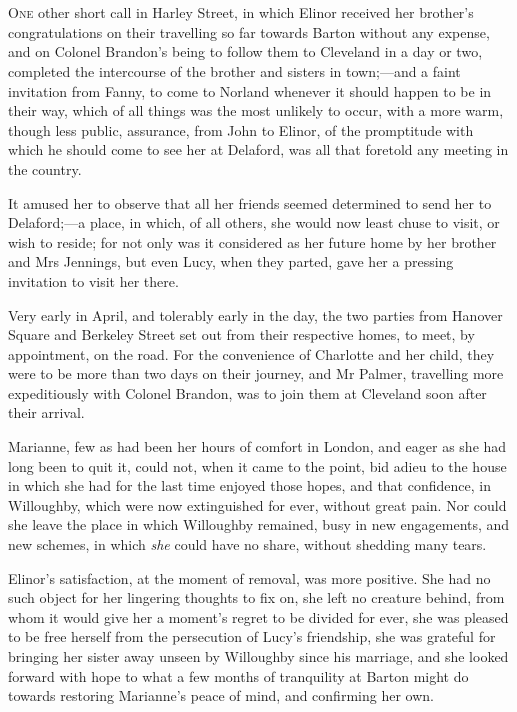 \chapter[Chapter \thechapter]{}
\lettrine[lraise=0.3]{O}{ne} other short call in Harley Street, in which Elinor received her brother's congratulations on their travelling so far towards Barton without any expense, and on Colonel Brandon's being to follow them to Cleveland in a day or two, completed the intercourse of the brother and sisters in town;—and a faint invitation from Fanny, to come to Norland whenever it should happen to be in their way, which of all things was the most unlikely to occur, with a more warm, though less public, assurance, from John to Elinor, of the promptitude with which he should come to see her at Delaford, was all that foretold any meeting in the country.

It amused her to observe that all her friends seemed determined to send her to Delaford;—a place, in which, of all others, she would now least chuse to visit, or wish to reside; for not only was it considered as her future home by her brother and Mrs Jennings, but even Lucy, when they parted, gave her a pressing invitation to visit her there.

Very early in April, and tolerably early in the day, the two parties from Hanover Square and Berkeley Street set out from their respective homes, to meet, by appointment, on the road. For the convenience of Charlotte and her child, they were to be more than two days on their journey, and Mr Palmer, travelling more expeditiously with Colonel Brandon, was to join them at Cleveland soon after their arrival.

Marianne, few as had been her hours of comfort in London, and eager as she had long been to quit it, could not, when it came to the point, bid adieu to the house in which she had for the last time enjoyed those hopes, and that confidence, in Willoughby, which were now extinguished for ever, without great pain. Nor could she leave the place in which Willoughby remained, busy in new engagements, and new schemes, in which \textit{she} could have no share, without shedding many tears.

Elinor's satisfaction, at the moment of removal, was more positive. She had no such object for her lingering thoughts to fix on, she left no creature behind, from whom it would give her a moment's regret to be divided for ever, she was pleased to be free herself from the persecution of Lucy's friendship, she was grateful for bringing her sister away unseen by Willoughby since his marriage, and she looked forward with hope to what a few months of tranquility at Barton might do towards restoring Marianne's peace of mind, and confirming her own.

